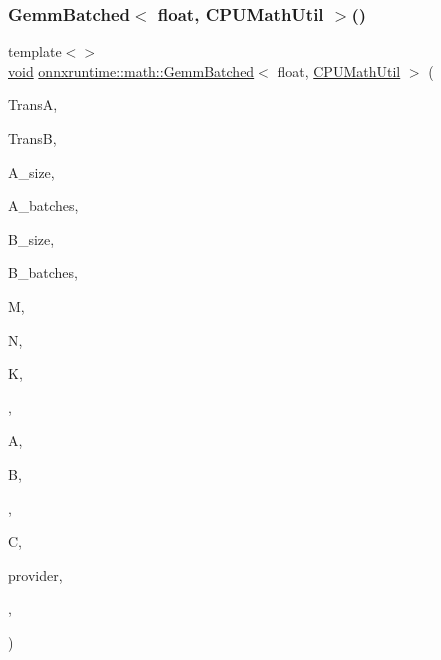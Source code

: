 \subsubsection{\texorpdfstring{Gemm\+Batched$<$ float, C\+P\+U\+Math\+Util $>$()}{GemmBatched< float, CPUMathUtil >()}}
{\footnotesize\ttfamily template$<$$>$ \\
\mbox{\hyperlink{mlasi_8h_a88f941d423cb2a819b70a1358982b1a6}{void}} \mbox{\hyperlink{namespaceonnxruntime_1_1math_ae3525472d980958f066d644d49660a5f}{onnxruntime\+::math\+::\+Gemm\+Batched}}$<$ float, \mbox{\hyperlink{classonnxruntime_1_1CPUMathUtil}{C\+P\+U\+Math\+Util}} $>$ (\begin{DoxyParamCaption}\item[{const \mbox{\hyperlink{cblas_8h_a44dfaddb823648755b110dbad849c5a9}{C\+B\+L\+A\+S\+\_\+\+T\+R\+A\+N\+S\+P\+O\+SE}}}]{TransA,  }\item[{const \mbox{\hyperlink{cblas_8h_a44dfaddb823648755b110dbad849c5a9}{C\+B\+L\+A\+S\+\_\+\+T\+R\+A\+N\+S\+P\+O\+SE}}}]{TransB,  }\item[{const int}]{A\+\_\+size,  }\item[{const int}]{A\+\_\+batches,  }\item[{const int}]{B\+\_\+size,  }\item[{const int}]{B\+\_\+batches,  }\item[{const int}]{M,  }\item[{const int}]{N,  }\item[{const int}]{K,  }\item[{const float}]{,  }\item[{const float $\ast$}]{A,  }\item[{const float $\ast$}]{B,  }\item[{const float}]{,  }\item[{float $\ast$}]{C,  }\item[{\mbox{\hyperlink{classonnxruntime_1_1CPUMathUtil}{C\+P\+U\+Math\+Util}} $\ast$}]{provider,  }\item[{\mbox{\hyperlink{classonnxruntime_1_1Tensor}{Tensor}} $\ast$}]{,  }\item[{\mbox{\hyperlink{namespaceonnxruntime_ad77d0a6e838ec7da5dc35fed5ee66b49}{M\+L\+Data\+Type}}}]{ }\end{DoxyParamCaption})}

\mbox{\label{namespaceonnxruntime_1_1math_a9c33fbd7bdc74a3620921afbc8135451}} 
